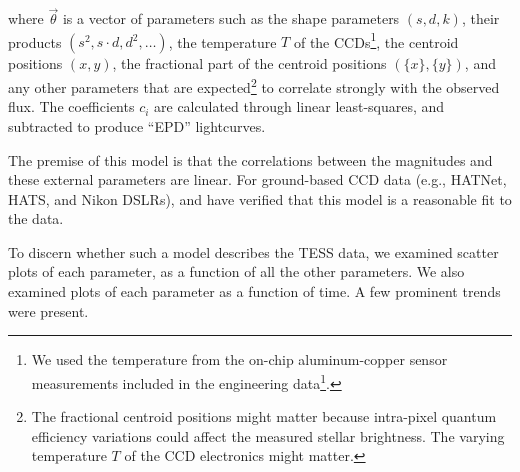 \documentclass[12pt,twocolumn,tighten]{aastex62}
\begin{document}
where $\vec{\theta}$ is a vector of parameters such as the shape
parameters $(s,d,k)$, their products $(s^2, s\cdot d, d^2, \ldots)$,
the temperature $T$ of the CCDs\footnote{ We used the temperature from
the on-chip aluminum-copper sensor measurements included in the
engineering
data\footnote{\url{archive.stsci.edu/missions/tess/engineering/}}.  },
the centroid positions $(x,y)$, the fractional part of the
centroid positions $(\{x\},\{y\})$, and any other parameters that are
expected\footnote{ The fractional centroid positions might matter
because intra-pixel quantum efficiency variations could affect the
measured stellar brightness.  The varying temperature $T$ of the CCD
electronics might matter.  } to correlate strongly with the observed
flux.  The coefficients $c_i$ are calculated through linear
least-squares, and subtracted to produce ``EPD'' lightcurves.

The premise of this model is that the correlations between the
magnitudes and these external parameters are linear.  For ground-based
CCD data (e.g., HATNet, HATS, and Nikon DSLRs), \citet{bakos_2010} and
\citet{zhang_precision_2016} have verified that this model is a
reasonable fit to the data.

To discern whether such a model describes the TESS data, we examined scatter 
plots of each
parameter, as a function of all the other parameters.  We also
examined plots of each parameter as a function of time.
A few prominent trends were present.
\end{document}
